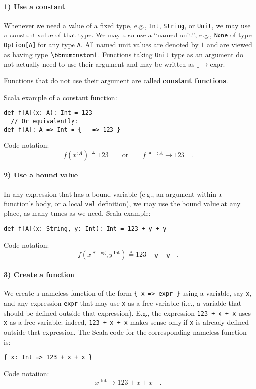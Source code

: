 \paragraph{1) Use a constant}

Whenever we need a value of a fixed type, e.g., \lstinline!Int!,
\lstinline!String!, or \lstinline!Unit!, we may use a constant value
of that type. We may also use a \textsf{``}named unit\textsf{''},
e.g., \lstinline!None! of type \lstinline!Option[A]! for any type
\lstinline!A!. All named unit values are denoted by $1$ and are
viewed as having type $\bbnum 1$. Functions taking \lstinline!Unit!
type as an argument do not actually need to use their argument and
may be written as $\_\rightarrow\text{expr}$.

Functions that do not use their argument are called \textbf{constant
functions}.

Scala example of a constant function:
\begin{lstlisting}
def f[A](x: A): Int = 123
  // Or equivalently:
def f[A]: A => Int = { _ => 123 }
\end{lstlisting}
Code notation:
\[
f(x^{:A})\triangleq123\quad\quad\text{or}\quad\quad f\triangleq\_^{:A}\rightarrow123\quad.
\]


\paragraph{2) Use a bound value}

In any expression that has a bound variable
(e.g., an argument within a function\textsf{'}s body, or a local \lstinline!val!
definition), we may use the bound value at any place, as many times
as we need. Scala example:
\begin{lstlisting}
def f[A](x: String, y: Int): Int = 123 + y + y
\end{lstlisting}
Code notation:
\[
f(x^{:\text{String}},y^{:\text{Int}})\triangleq123+y+y\quad.
\]


\paragraph{3) Create a function}

We create a nameless function of the form \lstinline!{ x => expr }!
using a variable, say \lstinline!x!, and any expression \lstinline!expr!
that may use \lstinline!x! as a free variable
(i.e., a variable that should be defined outside that expression).
E.g., the expression \lstinline!123 + x + x! uses \lstinline!x!
as a free variable: indeed, \lstinline!123 + x + x! makes sense only
if \lstinline!x! is already defined outside that expression. The
Scala code for the corresponding nameless function is:
\begin{lstlisting}
{ x: Int => 123 + x + x }
\end{lstlisting}
Code notation:
\[
x^{:\text{Int}}\rightarrow123+x+x\quad.
\]

